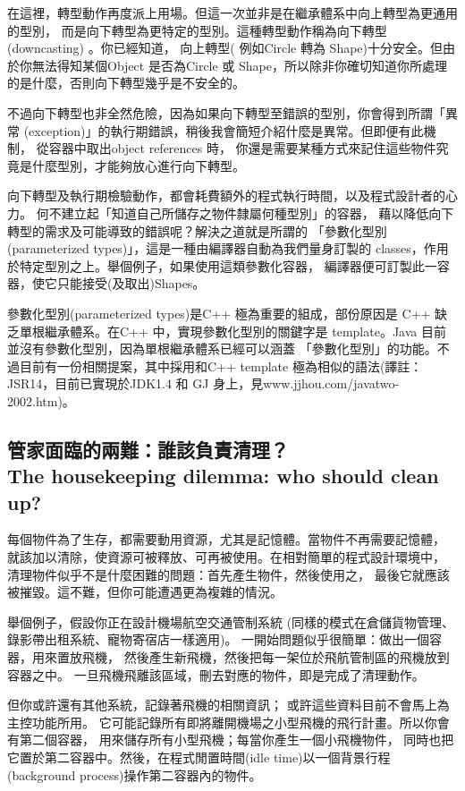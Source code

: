 在這裡，轉型動作再度派上用場。但這一次並非是在繼承體系中向上轉型為更通用的型別，
而是向下轉型為更特定的型別。這種轉型動作稱為向下轉型
(downcasting) 。你已經知道， 向上轉型( 例如Circle 轉為
Shape)十分安全。但由於你無法得知某個Object 是否為Circle 或
Shape，所以除非你確切知道你所處理的是什麼，否則向下轉型幾乎是不安全的。

不過向下轉型也非全然危險，因為如果向下轉型至錯誤的型別，你會得到所謂「異常
(exception)」的執行期錯誤，稍後我會簡短介紹什麼是異常。但即便有此機制，
從容器中取出object references 時，
你還是需要某種方式來記住這些物件究竟是什麼型別，才能夠放心進行向下轉型。

向下轉型及執行期檢驗動作，都會耗費額外的程式執行時間，以及程式設計者的心力。
何不建立起「知道自己所儲存之物件隸屬何種型別」的容器，
藉以降低向下轉型的需求及可能導致的錯誤呢？解決之道就是所謂的
「參數化型別(parameterized types)」，這是一種由編譯器自動為我們量身訂製的
classes，作用於特定型別之上。舉個例子，如果使用這類參數化容器，
編譯器便可訂製此一容器，使它只能接受(及取出)Shapes。

參數化型別(parameterized types)是C++ 極為重要的組成，部份原因是
C++ 缺乏單根繼承體系。在C++ 中，實現參數化型別的關鍵字是
template。Java 目前並沒有參數化型別，因為單根繼承體系已經可以涵蓋
「參數化型別」的功能。不過目前有一份相關提案，其中採用和C++
template 極為相似的語法(譯註：JSR14，目前已實現於JDK1.4 和
GJ 身上，見www.jjhou.com/javatwo-2002.htm)。
\subsection[管家面臨的兩難：誰該負責清理？]{管家面臨的兩難：誰該負責清理？ \\
The housekeeping dilemma: who should clean up?}
每個物件為了生存，都需要動用資源，尤其是記憶體。當物件不再需要記憶體，
就該加以清除，使資源可被釋放、可再被使用。在相對簡單的程式設計環境中，
清理物件似乎不是什麼困難的問題：首先產生物件，然後使用之，
最後它就應該被摧毀。這不難，但你可能遭遇更為複雜的情況。

舉個例子，假設你正在設計機場航空交通管制系統
(同樣的模式在倉儲貨物管理、錄影帶出租系統、寵物寄宿店一樣適用)。
一開始問題似乎很簡單：做出一個容器，用來置放飛機，
然後產生新飛機，然後把每一架位於飛航管制區的飛機放到容器之中。
一旦飛機飛離該區域，刪去對應的物件，即是完成了清理動作。

但你或許還有其他系統，記錄著飛機的相關資訊；
或許這些資料目前不會馬上為主控功能所用。
它可能記錄所有即將離開機場之小型飛機的飛行計畫。所以你會有第二個容器，
用來儲存所有小型飛機；每當你產生一個小飛機物件，
同時也把它置於第二容器中。然後，在程式閒置時間(idle time)以一個背景行程
(background process)操作第二容器內的物件。

